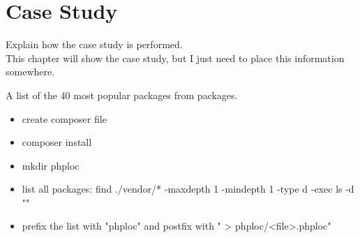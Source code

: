 \documentclass[main.tex]{subfiles}
\begin{document}
    
    \chapter{Case Study}
    Explain how the case study is performed.
    \\
    This chapter will show the case study, but I just need to place this information somewhere.
    
    A list of the 40 most popular packages from packages.
    
    \begin{itemize}
        \item create composer file
        \item composer install
        \item mkdir phploc
        \item list all packages: find ./vendor/* -maxdepth 1 -mindepth 1 -type d -exec ls -d "{}" \;
        \item prefix the list with "phploc" and postfix with " > phploc/<file>.phploc"
        
    \end{itemize}
\end{document}

